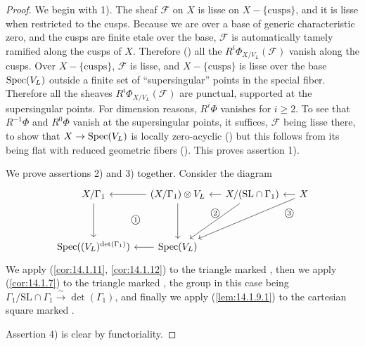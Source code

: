 \begin{proof}
We begin with 1). The sheaf $\mathcal{F}$ on $X$ is lisse on $X - \{\text{cusps}\}$, and it is lisse when restricted to the cusps. Because we are over a base of generic characteristic zero, and the cusps are finite etale over the base, $\mathcal{F}$ is automatically tamely ramified along the cusps of $X$. Therefore (\cite[7, Exp.~XIII, 2.1.11]{SGA}) all the $R^i \Phi_{X/V_L}(\mathcal{F})$ vanish along the cusps.
Over $X - \{\text{cusps}\}$, $\mathcal{F}$ is lisse, and $X - \{\text{cusps}\}$ is lisse over the base $\operatorname{Spec}(V_L)$ outside a finite set of ``supersingular'' points in the special fiber. Therefore all the sheaves $R^i \Phi_{X/V_L}(\mathcal{F})$ are punctual, supported at the supersingular points. For dimension reasons, $R^i \Phi$ vanishes for $i \ge 2$. To see that $R^{-1}\Phi$ and $R^0 \Phi$ vanish at the supersingular points, it suffices, $\mathcal{F}$ being lisse there, to show that $X \to \operatorname{Spec}(V_L)$ is locally zero-acyclic (\cite[4, Exp.~XV, 1.11]{SGA}) but this follows from its being flat with reduced geometric fibers (\cite[4, Exp.~XV, 4.1]{SGA}). This proves assertion 1).

We prove assertions 2) and 3) together. Consider the diagram
\[
\begin{tikzcd}[row sep=3.5em, column sep=1.2em]
X/\Gamma_1 \arrow[d] & (X/\Gamma_1) \otimes V_L \arrow[l] \arrow[d] & X/(\mathrm{SL} \cap \Gamma_1) \arrow[l] \arrow[ld] & X \arrow[l] \arrow[lld] \\
\Spec((V_L)^{\det(\Gamma_1)}) & \Spec(V_L) \arrow[l] & & {}
\arrow[phantom, from=1-1, to=2-2, "\text{\textcircled{\scriptsize 1}}"]
\arrow[phantom, from=1-2, to=1-3, shift right=2em, "\text{\textcircled{\scriptsize 2}}"]
\arrow[phantom, from=1-3, to=1-4, shift right=2em, "\text{\textcircled{\scriptsize 3}}"]
\end{tikzcd}
\]
We apply (\ref{cor:14.1.11}, \ref{cor:14.1.12}) to the triangle marked , then we apply (\ref{cor:14.1.7}) to the triangle marked , the group in this case being $\Gamma_1/\mathrm{SL} \cap \Gamma_1 \xrightarrow{\ \sim\ } \det(\Gamma_1)$, and finally we apply (\ref{lem:14.1.9.1}) to the cartesian square marked .

Assertion 4) is clear by functoriality.
\end{proof}

